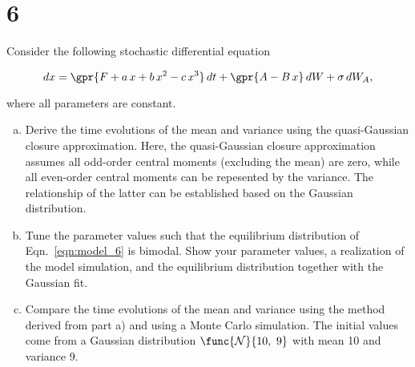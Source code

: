 \section{6}

Consider the following stochastic differential equation

\begin{equation}
	dx = \gpr{F + a\,x + b\,x^2 - c\,x^3}\,dt + \gpr{A - B\,x}\,dW + \sigma\,d{W_{A}},
	\label{eqn:model_6}
\end{equation}

where all parameters are constant.

\begin{enumerate}[a)]
	\item Derive the time evolutions of the mean and variance using the quasi-Gaussian closure approximation. Here, the quasi-Gaussian closure approximation assumes all odd-order central moments (excluding the mean) are zero, while all even-order central moments can be repesented by the variance. The relationship of the latter can be established based on the Gaussian distribution.
	
	\item Tune the parameter values such that the equilibrium distribution of Eqn.~\ref{eqn:model_6} is bimodal. Show your parameter values, a realization of the model simulation, and the equilibrium distribution together with the Gaussian fit.
	
	\item Compare the time evolutions of the mean and variance using the method derived from part a) and using a Monte Carlo simulation. The initial values come from a Gaussian distribution $\func{\mathcal{N}}{10,\ 9}$ with mean 10 and variance 9.
\end{enumerate}